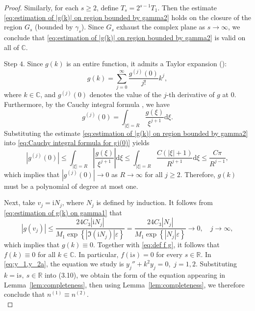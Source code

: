 \documentclass[11pt,reqno]{amsart}
\theoremstyle{definition}
\theoremstyle{remark}
\numberwithin{equation}{section}
\begin{document}
\begin{proof}
Similarly, for each $s \geq 2$, define $T_s = 2^{s-1}T_1$. Then the estimate \eqref{eq:estimation of |g(k)| on region bounded by gamma2} holds on the closure of the region $G_{s}$ (bounded by $\gamma_s$). Since $G_{s}$ exhaust the complex plane as $s \to \infty$, we conclude that \eqref{eq:estimation of |g(k)| on region bounded by gamma2} is valid on all of $\mathbb{C}$.


	
Step $4$. Since $g(k)$ is an entire function, it admits a Taylor expansion (\cite{SS10}):
\begin{equation*}
	g(k)=\sum_{j=0}^{\infty}\frac{g^{(j)}(0)}{j!}k^j,
\end{equation*}
where $k \in \mathbb{C}$, and $g^{(j)}(0)$ denotes the value of the $j$-th derivative of $g$ at $0$. Furthermore, by the Cauchy integral formula \cite{SS10}, we have
\begin{equation}\label{eq:Cauchy integral formula for gj(0)}
	g^{(j)}(0)=\int_{|\xi|=R}\frac{g(\xi)}{\xi^{j+1}}\mathrm{d}\xi.
\end{equation}
Substituting the estimate \eqref{eq:estimation of |g(k)| on region bounded by gamma2} into \eqref{eq:Cauchy integral formula for gj(0)} yields	
\begin{equation*}
	|g^{(j)}(0)|\leq \int_{|\xi|=R}\left|\frac{g(\xi)}{\xi^{j+1}}\right|\mathrm{d}\xi\leq \int_{|\xi|=R}\frac{C(|\xi|+1)}{R^{j+1}}\mathrm{d}\xi\leq \frac{C\pi}{R^{j-1}},
\end{equation*}
which implies that $|g^{(j)}(0)| \to 0$ as $R \to \infty$ for all $j \geq 2$. Therefore, $g(k)$ must be a polynomial of degree at most one.
	
Next, take $v_j = \mathrm{i} N_j$, where $N_j$ is defined by induction. It follows from \eqref{eq:estimation of g(k) on gamma1} that
\begin{equation*}
    \left|g(v_j)\right|\leq \frac{24{C}_3|\mathrm{i}N_j|}{M_1\exp{\left\{\left|\Im \left(\mathrm{i}N_j\right) \right|\varepsilon\right\}}}=\frac{24{C}_3|N_j|}{M_1\exp{\left\{\left|N_j \right|\varepsilon\right\}}} \to 0, \quad j\to \infty,
\end{equation*}
which implies that $g(k) \equiv 0$. Together with \eqref{eq:def f g}, it follows that $f(k) \equiv 0$ for all $k \in \mathbb{C}$. In particular, $f(\mathrm{i}s) = 0$ for every $s \in \mathbb{R}$. In \eqref{eq:y_1,y_2a}, the equation we study is
$y_{j}'' + k^2 y_{j} = 0$,~$j=1,2$.
Substituting $k = \mathrm{i}s,\ s \in \mathbb{R}$ into (3.10), we obtain the form of the equation appearing in Lemma~\ref{lem:completeness}, then using Lemma~\ref{lem:completeness}, we therefore conclude that $n^{(1)} \equiv n^{(2)}$.\\
 


\end{proof}
\end{document}
